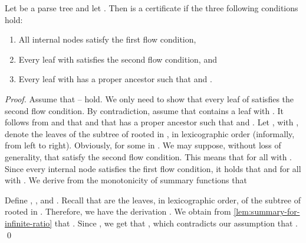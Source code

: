 \begin{lemma}
  \label{fact:certificate-decidable}
  Let  be a parse tree and
  let .
  Then  is a certificate if
  the three following conditions hold:
  \begin{enumerate}
  \item[]
    All internal nodes satisfy the first flow condition,
  \item[]
    Every leaf  with 
    satisfies the second flow condition, and
  \item[]
    Every leaf  with 
    has a proper ancestor  such that
     and .
  \end{enumerate}
\end{lemma}
\begin{proof}
  Assume that -- hold.
  We only need to show that every leaf of  satisfies
  the second flow condition.
  By contradiction, assume that  contains a leaf  with
  .
  It follows from  and  that 
  and that  has a proper ancestor  such that
   and .
  Let ,
  with ,
  denote the leaves of the subtree of  rooted in ,
  in lexicographic order (informally, from left to right).
  Obviously,  for some  in .
  We may suppose, without loss of generality,
  that  satisfy the second flow condition.
  This means that
   for all  with .
  Since every internal node satisfies the first flow condition,
  it holds that  and
   for all  with .
  We derive from the monotonicity of summary functions that
  
  Define , , and
  .
  Recall that  are the leaves,
  in lexicographic order,
  of the subtree of  rooted in .
  Therefore, we have the derivation .
  We obtain from \cref{lem:summary-for-infinite-ratio} that
  .
  Since , we get that ,
  which contradicts our assumption that
  .
  \qed
\end{proof}

